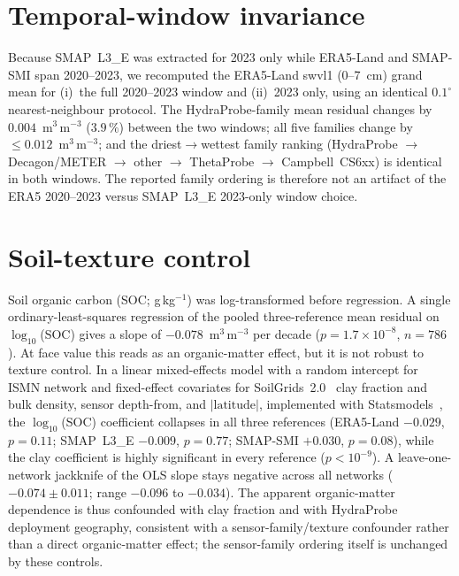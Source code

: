 \documentclass[11pt]{article}
\begin{document}
\section{Temporal-window invariance}
Because SMAP~L3\_E was extracted for 2023 only while ERA5-Land and
SMAP-SMI span 2020–2023, we recomputed the ERA5-Land swvl1 (0–7~cm)
grand mean for (i)~the full 2020–2023 window and (ii)~2023 only, using
an identical $0.1^\circ$ nearest-neighbour protocol. The HydraProbe-family
mean residual changes by $0.004$~m$^3$\,m$^{-3}$ ($3.9\,\%$) between the
two windows; all five families change by $\le0.012$~m$^3$\,m$^{-3}$; and
the driest$\rightarrow$wettest family ranking (HydraProbe $\rightarrow$
Decagon/METER $\rightarrow$ other $\rightarrow$ ThetaProbe $\rightarrow$
Campbell~CS6xx) is identical in both windows. The reported family
ordering is therefore not an artifact of the ERA5 2020–2023 versus
SMAP~L3\_E 2023-only window choice.

\section{Soil-texture control}
Soil organic carbon (SOC; g\,kg$^{-1}$) was log-transformed before
regression. A single ordinary-least-squares regression of the pooled
three-reference mean residual on $\log_{10}$(SOC) gives a slope of
$-0.078$~m$^3$\,m$^{-3}$ per decade ($p=1.7\times10^{-8}$, $n=786$).
At face value this reads as an organic-matter effect, but it is not
robust to texture control. In a linear mixed-effects model with a
random intercept for ISMN network and fixed-effect covariates for
SoilGrids~2.0~\cite{Poggio2021} clay fraction and bulk density, sensor
depth-from, and $|\text{latitude}|$, implemented with
Statsmodels~\cite{Seabold2010}, the $\log_{10}$(SOC) coefficient
collapses in all three references (ERA5-Land $-0.029$, $p=0.11$;
SMAP~L3\_E $-0.009$, $p=0.77$; SMAP-SMI $+0.030$, $p=0.08$), while
the clay coefficient is highly significant in every reference
($p<10^{-9}$). A leave-one-network jackknife of the OLS slope stays
negative across all networks ($-0.074\pm0.011$; range $-0.096$ to
$-0.034$). The apparent organic-matter dependence is thus confounded
with clay fraction and with HydraProbe deployment geography, consistent
with a
sensor-family/texture confounder rather than a direct organic-matter
effect; the sensor-family ordering itself is unchanged by these
controls.
\end{document}
